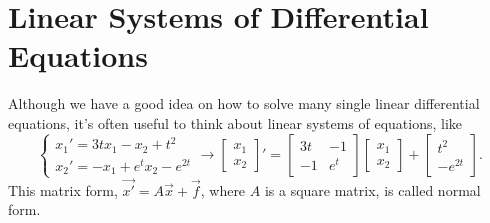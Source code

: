 \chapter{Linear Systems of Differential Equations}
Although we have a good idea on how to solve many single linear differential equations, it's often useful to think about linear systems of equations, like
\begin{equation*}
	\begin{cases}
		x_1' = 3tx_1 - x_2 + t^2 \\
		x_2' = -x_1 + e^tx_2 - e^{2t}
	\end{cases}
	\to
	\begin{bmatrix}
		x_1 \\ 
		x_2
	\end{bmatrix}' = \begin{bmatrix}
		3t & -1 \\
		-1 & e^t
	\end{bmatrix} \begin{bmatrix}
		x_1 \\
		x_2
	\end{bmatrix} + \begin{bmatrix}
		t^2 \\
		-e^{2t}
	\end{bmatrix}.
\end{equation*}
This matrix form, $\vec{x'} = A\vec{x} + \vec{f}$, where $A$ is a square matrix, is called normal form.\\




